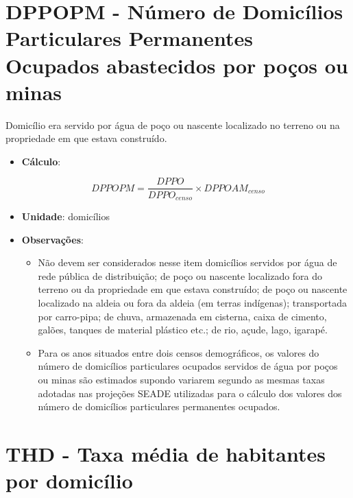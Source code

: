 \documentclass[]{book}
\providecommand{\tightlist}{%
  \setlength{\itemsep}{0pt}\setlength{\parskip}{0pt}}
\begin{document}
\hypertarget{dppopm---nuxfamero-de-domicuxedlios-particulares-permanentes-ocupados-abastecidos-por-pouxe7os-ou-minas}{%
\section*{DPPOPM - Número de Domicílios Particulares Permanentes Ocupados abastecidos por poços ou minas}\label{dppopm---nuxfamero-de-domicuxedlios-particulares-permanentes-ocupados-abastecidos-por-pouxe7os-ou-minas}}

Domicílio era servido por água de poço ou nascente localizado no terreno ou na propriedade em que estava construído.

\begin{itemize}
\tightlist
\item
  \textbf{Cálculo}:
\end{itemize}

\[
DPPOPM = \frac{DPPO}{DPPO_{censo}} \times DPPOAM_{censo}
\]

\begin{itemize}
\item
  \textbf{Unidade}: domicílios
\item
  \textbf{Observações}:

  \begin{itemize}
  \tightlist
  \item
    Não devem ser considerados nesse item domicílios servidos por água de rede pública de distribuição; de poço ou nascente localizado fora do terreno ou da propriedade em que estava construído; de poço ou nascente localizado na aldeia ou fora da aldeia (em terras indígenas); transportada por carro-pipa; de chuva, armazenada em cisterna, caixa de cimento, galões, tanques de material plástico etc.; de rio, açude, lago, igarapé.
  \item
    Para os anos situados entre dois censos demográficos, os valores do número de domicílios particulares ocupados servidos de água por poços ou minas são estimados supondo variarem segundo as mesmas taxas adotadas nas projeções SEADE utilizadas para o cálculo dos valores dos número de domicílios particulares permanentes ocupados.
  \end{itemize}
\end{itemize}

\hypertarget{thd---taxa-muxe9dia-de-habitantes-por-domicuxedlio}{%
\section*{THD - Taxa média de habitantes por domicílio}\label{thd---taxa-muxe9dia-de-habitantes-por-domicuxedlio}}
\end{document}
